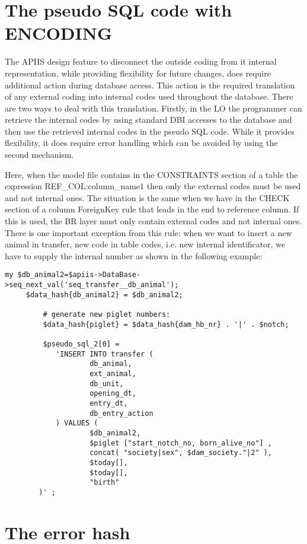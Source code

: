 \section{The pseudo SQL code with ENCODING}

The APIIS design feature to disconnect the outside coding from it
internal representation, while providing flexibility for future changes,
does require additional action during database access. This action
is the required translation of any external coding into internal codes
used throughout the database. There are two ways to deal with this
translation. Firstly, in the LO the programmer can retrieve the internal
codes by using standard DBI accesses to the database and then use
the retrieved internal codes in the pseudo SQL code. While it provides
flexibility, it does require error handling which can be avoided by
using the second mechanism.

Here, when the model file contains in the CONSTRAINTS section of a table the expression REF\_COL:column\_name1 then only the external codes must be used and not internal ones. The situation is the same when we have in the CHECK section of a column ForeignKey rule that leads in the end to reference column. If this is used, the BR layer
must only contain external codes and not internal ones. There is one important exception from this rule: when we want to insert a new animal in transfer, new code in table codes, i.e. new internal identificator, we have to supply the internal number as shown in the following example:
\begin{verbatim}
my $db_animal2=$apiis->DataBase->seq_next_val('seq_transfer__db_animal');
	 $data_hash{db_animal2} = $db_animal2;

         # generate new piglet numbers:
         $data_hash{piglet} = $data_hash{dam_hb_nr} . '|' . $notch;

         $pseudo_sql_2[0] =
            'INSERT INTO transfer (
                    db_animal,
                    ext_animal,
                    db_unit,
                    opening_dt,
                    entry_dt,
                    db_entry_action
            ) VALUES (
                    $db_animal2,
                    $piglet ["start_notch_no, born_alive_no"] ,
                    concat( "society|sex", $dam_society."|2" ),
                    $today[],
                    $today[],
                    "birth"
	    )' ;
\end{verbatim} 


\section{The error hash\label{errorhash}}

